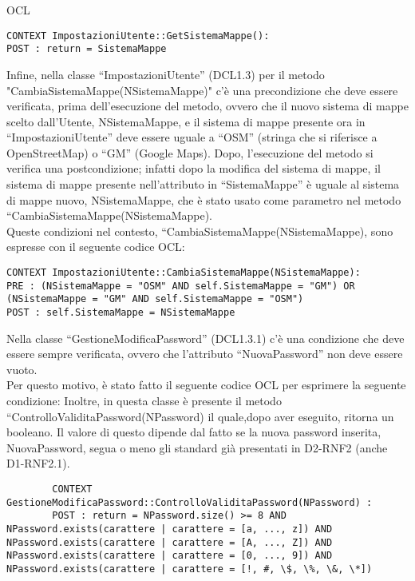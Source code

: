 \begin{listaPersonale}{OCL}
\begin{lstlisting}
CONTEXT ImpostazioniUtente::GetSistemaMappe():
POST : return = SistemaMappe 
    \end{lstlisting}
    Infine, nella classe “ImpostazioniUtente” (DCL1.3) per il metodo \\ "CambiaSistemaMappe(NSistemaMappe)" c'è una precondizione che deve essere verificata, prima dell'esecuzione del metodo, ovvero che il nuovo sistema di mappe scelto dall'Utente, NSistemaMappe, e il sistema di mappe presente ora in “ImpostazioniUtente” deve essere uguale a “OSM” (stringa che si riferisce a OpenStreetMap) o “GM” (Google Maps).
    Dopo, l'esecuzione del metodo si verifica una postcondizione; infatti dopo la modifica del sistema di mappe, il sistema di mappe presente nell'attributo in “SistemaMappe” è uguale al sistema di mappe nuovo, NSistemaMappe, che è stato usato come parametro nel metodo “CambiaSistemaMappe(NSistemaMappe).\\
    Queste condizioni nel contesto, “CambiaSistemaMappe(NSistemaMappe), sono espresse con il seguente codice OCL:

    \begin{lstlisting}
CONTEXT ImpostazioniUtente::CambiaSistemaMappe(NSistemaMappe):
PRE : (NSistemaMappe = "OSM" AND self.SistemaMappe = "GM") OR (NSistemaMappe = "GM" AND self.SistemaMappe = "OSM")
POST : self.SistemaMappe = NSistemaMappe
    \end{lstlisting}




    Nella classe “GestioneModificaPassword” (DCL1.3.1) c'è una condizione che deve essere sempre verificata, ovvero che l'attributo “NuovaPassword” non deve essere vuoto. \\
    Per questo motivo, è stato fatto il seguente codice OCL per esprimere la seguente condizione:
    Inoltre, in questa classe è presente il metodo “ControlloValiditaPassword(NPassword) il quale,dopo aver eseguito, ritorna un booleano. Il valore di questo dipende dal fatto se la nuova password inserita, NuovaPassword, segua o meno gli standard già presentati in D2-RNF2 (anche D1-RNF2.1).
    \begin{lstlisting}
        CONTEXT GestioneModificaPassword::ControlloValiditaPassword(NPassword) :
        POST : return = NPassword.size() >= 8 AND NPassword.exists(carattere | carattere = [a, ..., z]) AND NPassword.exists(carattere | carattere = [A, ..., Z]) AND NPassword.exists(carattere | carattere = [0, ..., 9]) AND NPassword.exists(carattere | carattere = [!, #, \$, \%, \&, \*])
    \end{lstlisting}


\end{listaPersonale}
